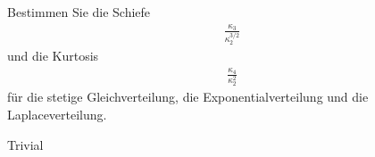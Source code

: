 \begin{exercise}
Bestimmen Sie die Schiefe
\begin{align*}
  \frac{\kappa_3}{\kappa_2^{3/2}}
\end{align*}
und die Kurtosis
\begin{align*}
  \frac{\kappa_4}{\kappa_2^2}
\end{align*}
für die stetige Gleichverteilung, die Exponentialverteilung und die Laplaceverteilung.
\end{exercise}

\begin{solution}

Trivial

\end{solution}
